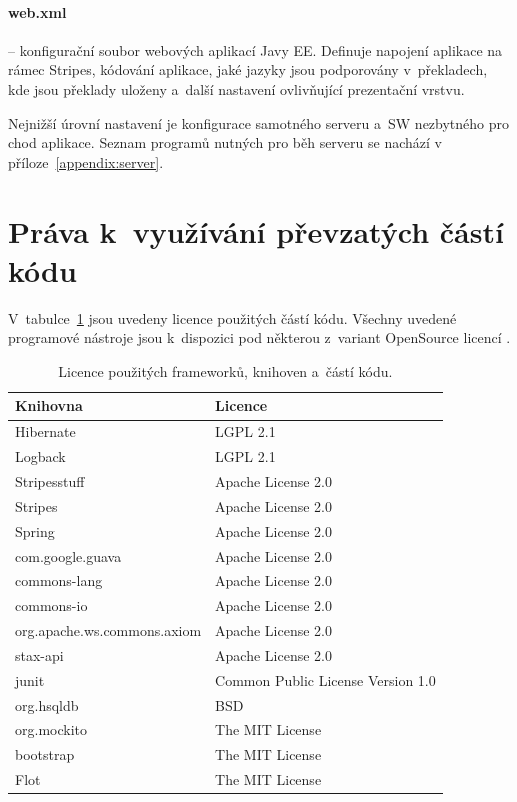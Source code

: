 \documentclass[11pt, final, oneside]{fithesis2}
\begin{document}
\paragraph*{web.xml} -- konfigurační soubor webových aplikací Javy EE. Definuje napojení aplikace na rámec Stripes, kódování aplikace, jaké jazyky jsou podporovány v~překladech, kde jsou překlady uloženy a~další nastavení ovlivňující prezentační vrstvu.

Nejnižší úrovní nastavení je konfigurace samotného serveru a~SW nezbytného pro chod aplikace. Seznam programů nutných pro běh serveru se nachází v příloze~\ref{appendix:server}.

\section{Práva k~využívání převzatých částí kódu}
V~tabulce~\ref{tab:libraries:license} jsou uvedeny licence použitých částí kódu.
Všechny uvedené programové nástroje jsou k~dispozici pod některou z~variant OpenSource licencí \cite{Licence}.

\begin{table}[ht] 
\centering
\begin{tabular}{l l}
\hline 
Knihovna & Licence \\
\hline \hline
Hibernate 									& LGPL 2.1 \\
Logback 										& LGPL 2.1 \\
Stripesstuff 								& Apache License 2.0 \\ 
Stripes 										& Apache License 2.0 \\ 
Spring 											& Apache License 2.0 \\ 
com.google.guava 						& Apache License 2.0 \\
commons-lang 								& Apache License 2.0 \\
commons-io 									& Apache License 2.0 \\
org.apache.ws.commons.axiom & Apache License 2.0 \\
stax-api 										& Apache License 2.0 \\
junit 											& Common Public License Version 1.0 \\
org.hsqldb 									& BSD \\
org.mockito 								& The MIT License \\
bootstrap 									& The MIT License \\
Flot 												& The MIT License \\

\hline %
\end{tabular} 
\caption{Licence použitých frameworků, knihoven a~částí kódu.}
\label{tab:libraries:license} %
\end{table} 
\end{document}
